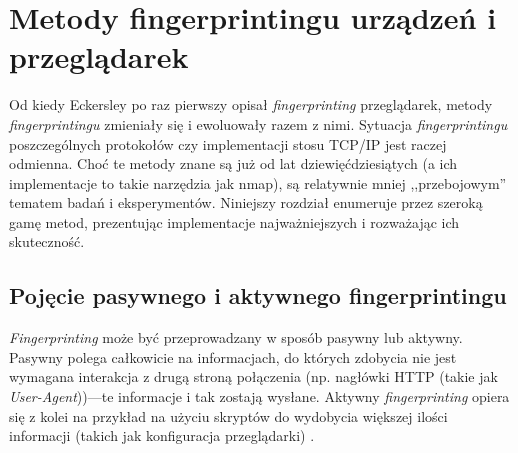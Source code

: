 \chapter{Metody fingerprintingu urządzeń i przeglądarek}
Od kiedy Eckersley \cite{eckersley2010unique} po raz pierwszy opisał
\emph{fingerprinting} przeglądarek, metody \emph{fingerprintingu} zmieniały się
i ewoluowały razem z nimi. Sytuacja \emph{fingerprintingu} poszczególnych
protokołów czy implementacji stosu TCP/IP jest raczej odmienna. Choć te metody
znane są już od lat dziewięćdziesiątych (a ich implementacje to takie narzędzia
jak nmap), są relatywnie mniej ,,przebojowym'' tematem badań i eksperymentów.
Niniejszy rozdział enumeruje przez szeroką gamę metod, prezentując implementacje
najważniejszych i rozważając ich skuteczność.

\section{Pojęcie pasywnego i aktywnego fingerprintingu}
\emph{Fingerprinting} może być przeprowadzany w sposób pasywny lub aktywny.
Pasywny polega całkowicie na informacjach, do których zdobycia nie jest wymagana
interakcja z drugą stroną połączenia (np. nagłówki HTTP (takie jak
\emph{User-Agent}))---te informacje i tak zostają wysłane. Aktywny
\emph{fingerprinting} opiera się z kolei na przykład na użyciu skryptów do
wydobycia większej ilości informacji (takich jak konfiguracja przeglądarki)
\cite[s. 3]{al2020too}.







